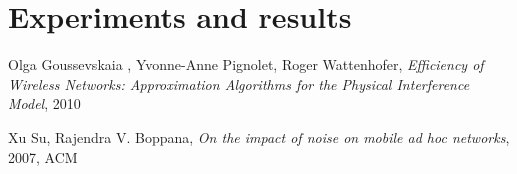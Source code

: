 \documentclass[a4paper,draft,12pt]{report}
\begin{document}
\chapter{Experiments and results}

\begin{thebibliography}{9}

Olga Goussevskaia , Yvonne-Anne
Pignolet, Roger Wattenhofer,
\emph{Efficiency of Wireless Networks:
Approximation Algorithms
for the Physical Interference Model},
2010

Xu Su, Rajendra V. Boppana,
\emph{On the impact of noise on mobile ad hoc networks},
2007, ACM

\end{thebibliography}
\end{document}
